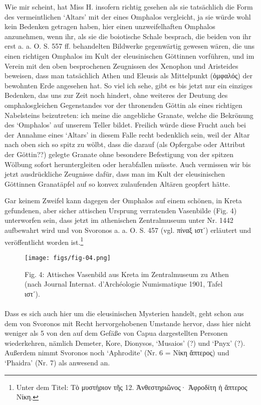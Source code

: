 \documentclass[a4paper, 11pt, oneside]{article}
\begin{document}
Wie mir scheint, hat Miss H. insofern richtig gesehen als sie tatsächlich die Form des vermeintlichen `Altars' mit der eines Omphalos vergleicht, ja sie würde wohl kein Bedenken getragen haben, hier einen unzweifelhaften Omphalos anzunehmen, wenn ihr, als sie die boiotische Schale besprach, die beiden von ihr erst a. a. O. S. 557 ff. behandelten Bildwerke gegenwärtig gewesen wären, die uns einen richtigen Omphalos im Kult der eleusinischen Göttinnen vorführen, und im Verein mit den oben besprochenen Zeugnissen des Xenophon und Aristeides beweisen, dass man tatsächlich Athen und Eleusis als Mittelpunkt (ὀμφαλός) der bewohnten Erde angesehen hat. So viel ich sehe, gibt es bis jetzt nur ein einziges Bedenken, das uns zur Zeit noch hindert, ohne weiteres der Deutung des omphalosgleichen Gegenstandes vor der thronenden Göttin als eines richtigen Nabelsteins beizutreten: ich meine die angebliche Granate, welche die Bekrönung des `Omphalos' auf unserem Teller bildet. Freilich würde diese Frucht auch bei der Annahme eines `Altars' in diesem Falle recht bedenklich sein, weil der Altar nach oben sich so spitz zu wölbt, dass die darauf (als Opfergabe oder Attribut der Göttin??) gelegte Granate ohne besondere Befestigung von der spitzen Wölbung sofort heruntergleiten oder herabfallen müsste. Auch vermissen wir bis jetzt ausdrückliche Zeugnisse dafür, dass man im Kult der eleusinischen Göttinnen Granatäpfel auf so konvex zulaufenden Altären geopfert hätte.

Gar keinem Zweifel kann dagegen der Omphalos auf einem schönen, in Kreta gefundenen, aber sicher attischen Ursprung verratenden Vasenbilde (Fig. 4) unterworfen sein, dass jetzt im athenischen Zentralmuseum unter Nr. 1442 aufbewahrt wird und von Svoronos a. a. O. S. 457 (vgl. πίναξ ιστʹ) erläutert und veröffentlicht worden ist.\footnote{Unter dem Titel: Τὸ μυστήριον τῆς 12. Ἀνθεστηριῶνος· Ἀφροδίτη ἡ ἄπτερος Νίκη.}

\begin{figure}[H]
\centering
\texttt{[image: figs/fig-04.png]}
\caption{Fig. 4: Attisches Vasenbild aus Kreta im Zentralmuseum zu Athen (nach Journal Internat. d'Archéologie Numismatique 1901, Tafel ιστʹ).}
\end{figure}
\paragraph{}
Dass es sich auch hier um die eleusinischen Mysterien handelt, geht schon aus dem von Svoronos mit Recht hervorgehobenen Umstande hervor, dass hier nicht weniger als 5 von den auf dem Gefäße von Capua dargestellten Personen wiederkehren, nämlich Demeter, Kore, Dionysos, `Musaios' (?) und `Pnyx' (?). Außerdem nimmt Svoronos noch `Aphrodite' (Nr. 6 = Νίκη ἄπτερος) und `Phaidra' (Nr. 7) als anwesend an.
\end{document}
